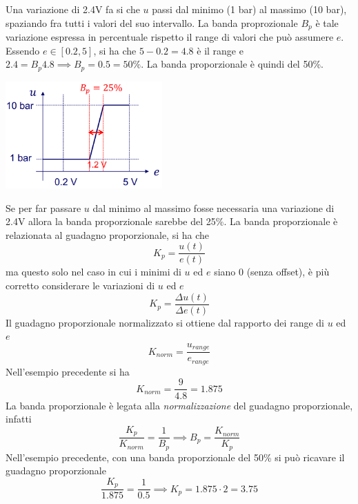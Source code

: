 \documentclass[10pt, letterpaper]{report}
\begin{document}
Una variazione di 2.4V fa si che $u$ passi dal minimo (1 bar) al massimo (10 bar), spaziando fra tutti i valori del suo intervallo. La banda proprozionale $B_p$ è tale variazione espressa in percentuale rispetto il range di valori che può assumere $e$. Essendo $e\in [0.2,5]$, si ha che $5-0.2 = 4.8$ è il range e $2.4=B_p4.8\implies B_p=0.5=50\%$. La banda proporzionale è quindi del 50\%. 
\begin{center}
    \includegraphics[width=0.45\textwidth]{images/bandaproporzionale2.png} 
\end{center}
Se per far passare $u$ dal minimo al massimo fosse necessaria una variazione di 2.4V allora la banda proporzionale sarebbe del 25\%.
\acc 
La banda proporzionale è relazionata al guadagno proporzionale, si ha che 
$$ K_p=\frac{u(t)}{e(t)}$$ 
ma questo solo nel caso in cui i minimi di $u$ ed $e$ siano 0 (senza offset), è più corretto considerare le variazioni di $u$ ed $e$
$$ K_p=\frac{\Delta u(t)}{\Delta e(t)}$$ 
Il guadagno proporzionale normalizzato si ottiene dal rapporto dei range di $u$ ed $e$
$$ K_{norm}=\frac{u_{range}}{e_{range}}$$
Nell'esempio precedente si ha 
$$ K_{norm}=\frac{9}{4.8}=1.875$$
La banda proporzionale è legata alla \textit{normalizzazione} del guadagno proporzionale, infatti 
$$ \frac{K_p}{K_{norm}}=\frac{1}{B_p}\implies B_p=\frac{K_{norm}}{K_p}$$
Nell'esempio precedente, con una banda proporzionale del 50\% si può ricavare il guadagno proporzionale 
$$ \frac{K_p}{1.875}=\frac{1}{0.5}\implies K_p=1.875\cdot 2 = 3.75$$
\end{document}
